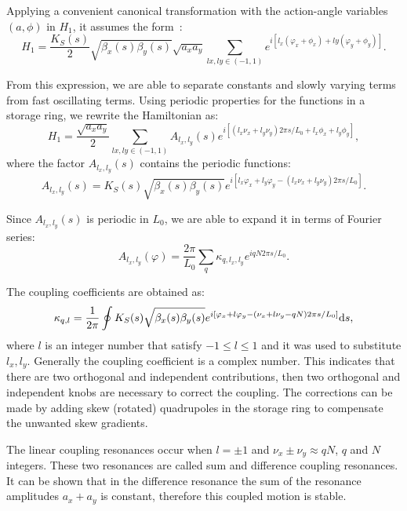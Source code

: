 Applying a convenient canonical transformation with the action-angle variables $(a, \phi)$ in $H_1$, it assumes the form~\cite{wiedemann2007physics}:
\begin{equation*}
    H_1 = \dfrac{K_S(s)}{2}\sqrt{\beta_x(s)\beta_y(s)} \sqrt{a_x a_y} \sum_{lx, ly \in (-1, 1)} e^{i\left[l_x(\varphi_x + \phi_x) + ly(\varphi_y + \phi_y)\right]}.
\end{equation*}

From this expression, we are able to separate constants and slowly varying terms from fast oscillating terms. Using periodic properties for the functions in a storage ring, we rewrite the Hamiltonian as:
\begin{equation*}
    H_1 = \dfrac{\sqrt{a_x a_y}}{2} \sum_{lx, ly \in (-1, 1)} A_{l_x, l_y}(s) e^{i\left[\left(l_x\nu_x + l_y\nu_y\right)2\pi s/L_0 + l_x\phi_x + l_y\phi_y\right]},
\end{equation*}
where the factor $A_{l_x, l_y}(s)$ contains the periodic functions:
\begin{equation*}
    A_{l_x, l_y}(s) = K_S(s) \sqrt{\beta_x(s) \beta_y(s)} e^{i\left[l_x\varphi_x + l_y\varphi_y - \left(l_x\nu_x + l_y\nu_y\right)2\pi s/L_0\right]}.
\end{equation*}

Since $A_{l_x, l_y}(s)$ is periodic in $L_0$, we are able to expand it in terms of Fourier series:
\begin{equation*}
    A_{l_x, l_y}(\varphi) = \dfrac{2\pi}{L_0} \sum_{q} \kappa_{q, l_x, l_y}e^{i q N 2 \pi s/L_0}.
\end{equation*}

The coupling coefficients are obtained as:
\begin{equation}
    \kappa_{q, l} = \dfrac{1}{2\pi} \oint K_S(s) \sqrt{\beta_x(s) \beta_y(s)} e^{i\left[\varphi_x + l\varphi_y - \left(\nu_x + l\nu_y - qN\right)2\pi s/L_0\right]}\mathrm{d} s,
\end{equation}
where $l$ is an integer number that satisfy $-1 \leq l \leq 1$ and it was used to substitute $l_x, l_y$. Generally the coupling coefficient is a complex number. This indicates that there are two orthogonal and independent contributions, then two orthogonal and independent knobs are necessary to correct the coupling. The corrections can be made by adding skew (rotated) quadrupoles in the storage ring to compensate the unwanted skew gradients.

The linear coupling resonances occur when $l = \pm 1$ and $\nu_x \pm \nu_y \approx qN$, $q$ and $N$ integers. These two resonances are called sum and difference coupling resonances. It can be shown that in the difference resonance the sum of the resonance amplitudes $a_x + a_y$ is constant, therefore this coupled motion is stable.

